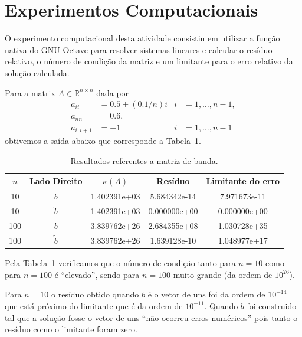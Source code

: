 \documentclass[12pt,a4paper]{article}
\begin{document}
\section{Experimentos Computacionais}
O experimento computacional desta atividade consistiu em utilizar a
fun\c{c}\~{a}o nativa do GNU Octave para resolver sistemas lineares e calcular o
res\'{i}duo relativo, o n\'{u}mero de condi\c{c}\~{a}o da matriz e um limitante
para o erro relativo da solu\c{c}\~{a}o calculada.

Para a matrix $A \in \mathbb{R}^{n \times n}$ dada por
\begin{align*}
    a_{ii} &= 0.5 + (0.1 / n) i & i &= 1, \ldots, n - 1, \\
    a_{nn} &= 0.6, \\
    a_{i,i+1} &= -1 & i &= 1, \ldots, n - 1
\end{align*}
obtivemos a sa\'{i}da abaixo que corresponde a
Tabela~\ref{tab:res_matriz_banda}.

\begin{table}[!htb]
    \centering
    \caption{Resultados referentes a matriz de banda.}
    \label{tab:res_matriz_banda}
    \begin{tabular}{|c|c|c|c|c|}
        \hline
        $n$ & Lado Direito & $\kappa(A)$ & Res\'{i}duo & Limitante do erro \\ \hline
        10 & $b$ & 1.402391e+03 & 5.684342e-14 & 7.971673e-11 \\ \hline
        10 & $\tilde{b}$ & 1.402391e+03 & 0.000000e+00 & 0.000000e+00 \\
        \hline
        100 & $b$ & 3.839762e+26 & 2.684355e+08 & 1.030728e+35 \\ \hline
        100 & $\tilde{b}$ & 3.839762e+26 & 1.639128e-10 & 1.048977e+17
        \\ \hline
    \end{tabular}
\end{table}

Pela Tabela~\ref{tab:res_matriz_banda} verificamos que o n\'{u}mero de
condi\c{c}\~{a}o tanto para $n = 10$ como para $n = 100$ \'{e} ``elevado'',
sendo para $n = 100$ muito grande (da ordem de $10^{26}$).

Para $n = 10$ o res\'{i}duo obtido quando $b$ \'{e} o vetor de uns foi da ordem
de $10^{-14}$ que est\'{a} pr\'{o}ximo do limitante que \'{e} da ordem de
$10^{-11}$. Quando $b$ foi construido tal que a solu\c{c}\~{a}o fosse o
vetor de uns ``n\~{a}o ocorreu erros num\'{e}ricos'' pois tanto o res\'{i}duo
como o limitante foram zero.
\end{document}
